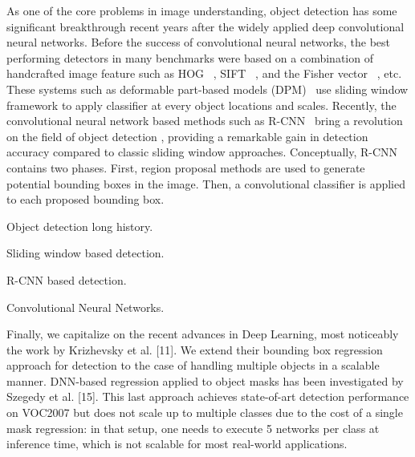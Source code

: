 As one of the core problems in image understanding, object detection has some significant breakthrough recent years after the widely applied deep convolutional neural networks. Before the success of convolutional neural networks, the best performing detectors in many benchmarks were based on a combination of handcrafted image feature such as HOG~\cite{dalal2005histograms} , SIFT~\cite{lowe2004distinctive} , and the Fisher vector~\cite{cinbis2013segmentation} , etc. These systems such as deformable part-based models (DPM)~\cite{felzenszwalb2010object} use sliding window framework to apply classifier at every object locations and scales. Recently, the convolutional neural network based methods such as R-CNN~\cite{girshick2014rich,girshick2015fast} bring a revolution on the field of object detection , providing a remarkable gain in detection accuracy compared to classic sliding window approaches. Conceptually, R-CNN contains two phases. First, region proposal methods are used to generate potential bounding boxes in the image. Then, a convolutional classifier is applied to each proposed bounding box. 

Object detection long history.

Sliding window based detection.

R-CNN based detection.

Convolutional Neural Networks.

Finally, we capitalize on the recent advances in Deep Learning, most noticeably the work by Krizhevsky et al. [11]. We extend their bounding box regression approach for detection to the case of handling multiple objects in a scalable manner. DNN-based regression applied to object masks has been investigated by Szegedy et al. [15]. This last approach achieves state-of-art detection performance on VOC2007 but does not scale up to multiple classes due to the cost of a single mask regression: in that setup, one needs to execute 5 networks per class at inference time, which is not scalable for most real-world applications.

